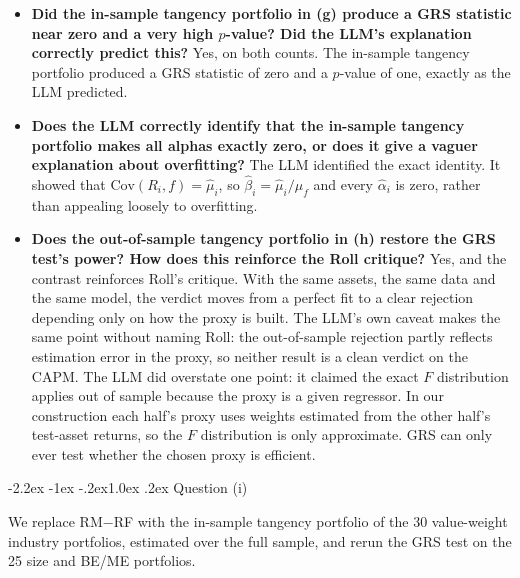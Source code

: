 \documentclass[11pt]{article}
\makeatletter
\renewcommand\subsection{\@startsection{subsection}{2}{0pt}%
  {-2.2ex \@plus -1ex \@minus -.2ex}{1.0ex \@plus .2ex}%
  {\normalfont\bfseries\normalsize\color{psink}}}
\makeatother
\begin{document}
\begin{itemize}
\setlength{\itemsep}{4pt}\setlength{\parskip}{0pt}

\item[(i)] \textbf{Did the in-sample tangency portfolio in (g) produce a
GRS statistic near zero and a very high $p$-value? Did the LLM's explanation
correctly predict this?} Yes, on both counts. The in-sample tangency portfolio
produced a GRS statistic of zero and a $p$-value of one, exactly as the LLM
predicted.

\item[(ii)] \textbf{Does the LLM correctly identify that the in-sample
tangency portfolio makes all alphas exactly zero, or does it give a vaguer
explanation about overfitting?} The LLM identified the exact identity. It
showed that
$\mathrm{Cov}(R_i, f) = \hat\mu_i$, so $\hat\beta_i = \hat\mu_i/\mu_f$ and
every $\hat\alpha_i$ is zero, rather than appealing loosely to overfitting.

\item[(iii)] \textbf{Does the out-of-sample tangency portfolio in (h)
restore the GRS test's power? How does this reinforce the Roll critique?}
Yes, and the contrast reinforces Roll's critique.
With the same assets, the same data and the same model, the verdict moves
from a perfect fit to a clear rejection depending only on how the proxy is
built. The LLM's own caveat makes the same point without naming Roll: the
out-of-sample rejection partly reflects estimation error in the proxy, so
neither result is a clean verdict on the CAPM. The LLM did overstate one point: it claimed the exact $F$ distribution applies out of sample because the proxy is a given regressor. In our construction each half's proxy uses weights estimated from the other half's test-asset returns, so the $F$ distribution is only approximate. GRS can only ever test
whether the chosen proxy is efficient.

\end{itemize}

\subsection{Question (i)}

We replace RM$-$RF with the in-sample tangency portfolio of the 30
value-weight industry portfolios, estimated over the full sample, and rerun
the GRS test on the 25 size and BE/ME portfolios.
\end{document}

